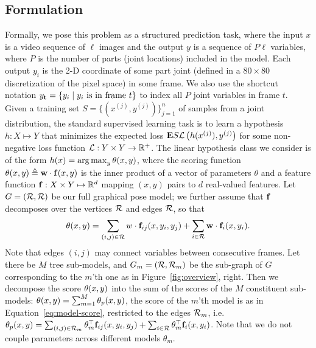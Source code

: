 \subsection{Formulation}
Formally, we pose this problem as a structured prediction task, where
the input $x$ is a video sequence of $\ell$ images and the output $y$ is a
sequence of $P\ell$ variables, where $P$ is the number of parts (joint
locations) included in the model. Each output $y_i$ is the 2-D
coordinate of some part joint (defined in a $80 \times 80$
discretization of the pixel space) in some frame.  We also use the shortcut notation 
$y_{\bf t} = \{ y_i \;|\; y_i \text{ is in frame } t \}$
to index all $P$ joint variables in frame $t$. Given a training set
$S = \{(x^{(j)},y^{(j)})\}_{j=1}^n$ of samples from a joint
distribution, the standard supervised learning task is to learn a
hypothesis $h: X \mapsto Y$ that minimizes the expected loss $\mathbf{E}{S}{
  \mathcal{L}\left(h(x^{(j)}) , y^{(j)}\right)}$ for some non-negative loss function $\mathcal{L}
: Y \times Y \rightarrow \mathbb{R}^+$. The linear hypothesis class we
consider is of the form $h(x) = \mathop{\arg\max}_y \theta(x,y)$, where the
scoring function $\theta(x,y) \triangleq \mathbf{w} \cdot \mathbf{f}(x,y)$ is the
inner product of a vector of parameters $\theta$ and a feature
function $\mathbf{f}: X \times Y \mapsto \mathbb{R}^d$ mapping $(x,y)$ pairs to
$d$ real-valued features. Let $G = (\mathcal{R},\mathcal{R})$ be our full graphical
pose model; we further assume that $\mathbf{f}$ decomposes over the vertices
$\mathcal{R}$ and edges $\mathcal{R}$, so that
\begin{equation}
  \label{eq:model-score}
  \theta(x,y) = \sum_{(i,j) \in \mathcal{R}}\\w \cdot \mathbf{f}_{ij}(x,y_i,y_j) +
  \sum_{i \in \mathcal{R}}\mathbf{w} \cdot \mathbf{f}_i(x,y_i).
\end{equation}
Note that edges $(i,j)$ may connect variables between consecutive
frames. Let there be $M$ tree sub-models, and $G_m = (\mathcal{R}, \mathcal{R}_m)$ be the sub-graph of $G$ corresponding
to the $m$'th one as in Figure~\ref{fig:overview}, right.  Then
we decompose the score $\theta(x,y)$ into the sum of the scores of the
$M$ constituent sub-models: $\theta(x,y) = \sum_{m=1}^M \theta_p(x,y)$, the
score of the $m$'th model is as in Equation~\ref{eq:model-score}, restricted to the
edges $\mathcal{R}_m$, i.e. $\theta_p(x,y) =
\sum_{(i,j)\in\mathcal{R}_m}\theta_m^\top\mathbf{f}_{ij}(x,y_i,y_j) +
\sum_{i\in\mathcal{R}}\theta_m^\top\mathbf{f}_i(x,y_i)$. Note that we do not couple
parameters across different models $\theta_m$.

